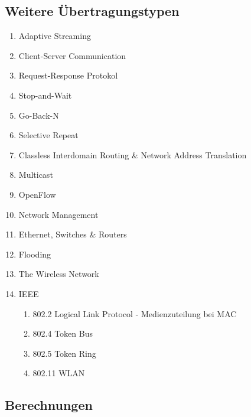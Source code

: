\documentclass{scrartcl}
\begin{document}
    \subsection{ Weitere Übertragungstypen }
    \begin{enumerate}
        \item Adaptive Streaming 
        \item Client-Server Communication
        \item Request-Response Protokol
        \item Stop-and-Wait
        \item Go-Back-N
        \item Selective Repeat
        \item Classless Interdomain Routing \& Network Address Translation %
        \item Multicast 
        \item OpenFlow
        \item Network Management
        \item Ethernet, Switches \& Routers
        \item Flooding %
        \item The Wireless Network
        \item IEEE
        \begin{enumerate}
            \item 802.2 Logical Link Protocol - Medienzuteilung bei MAC
            \item 802.4 Token Bus
            \item 802.5 Token Ring
            \item 802.11 WLAN
        \end{enumerate}
    \end{enumerate}
    
    \subsection{Berechnungen}
\end{document}
